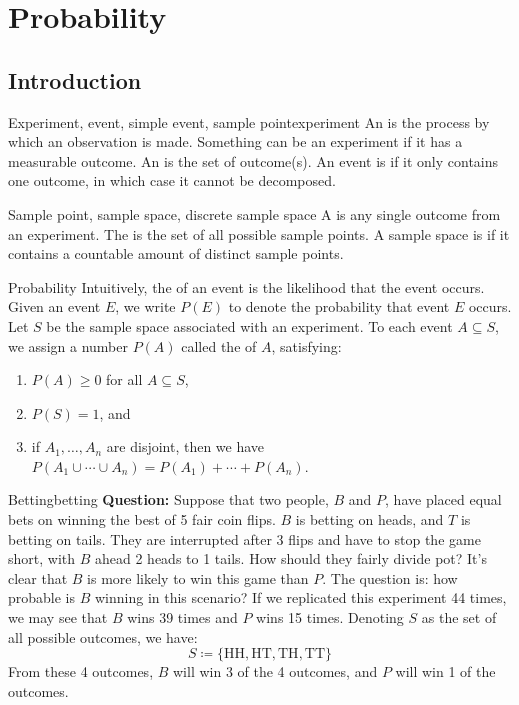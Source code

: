 \chapter{Probability}

\section{Introduction}

\begin{dfnbox}{Experiment, event, simple event, sample point}{experiment}
    An  is the process by which an observation is made. Something can be an experiment if it has a measurable outcome. An  is the set of outcome(s). An event is  if it only contains one outcome, in which case it cannot be decomposed.
\end{dfnbox}

\begin{dfnbox}{Sample point, sample space, discrete sample space}{}
    A  is any single outcome from an experiment. The  is the set of all possible sample points. A sample space is  if it contains a countable amount of distinct sample points.
\end{dfnbox}

\begin{dfnbox}{Probability}{}
    Intuitively, the  of an event is the likelihood that the event occurs. Given an event $E$, we write $P(E)$ to denote the probability that event $E$ occurs.
    \tcblower
    Let $S$ be the sample space associated with an experiment. To each event $A \subseteq S$, we assign a number $P(A)$ called the  of $A$, satisfying:
    \begin{enumerate}
        \item $P(A) \geq 0$ for all $A \subseteq S$,
        \item $P(S) = 1$, and
        \item if $A_1, \ldots, A_n$ are disjoint, then we have $P(A_1 \cup \cdots \cup A_n) = P(A_1) + \cdots + P(A_n)$.
    \end{enumerate}

\end{dfnbox}

\begin{exbox}{Betting}{betting}
    \textbf{Question:} Suppose that two people, $B$ and $P$, have placed equal bets on winning the best of 5 fair coin flips. $B$ is betting on heads, and $T$ is betting on tails. They are interrupted after 3 flips and have to stop the game short, with $B$ ahead 2 heads to 1 tails. How should they fairly divide pot?
    \tcblower
    It's clear that $B$ is more likely to win this game than $P$. The question is: how probable is $B$ winning in this scenario? If we replicated this experiment 44 times, we may see that $B$ wins 39 times and $P$ wins 15 times. Denoting $S$ as the set of all possible outcomes, we have:
    \[ S \coloneq \{ \text{HH}, \text{HT}, \text{TH}, \text{TT} \} \]
    From these 4 outcomes, $B$ will win 3 of the 4 outcomes, and $P$ will win 1 of the  outcomes.
\end{exbox}

